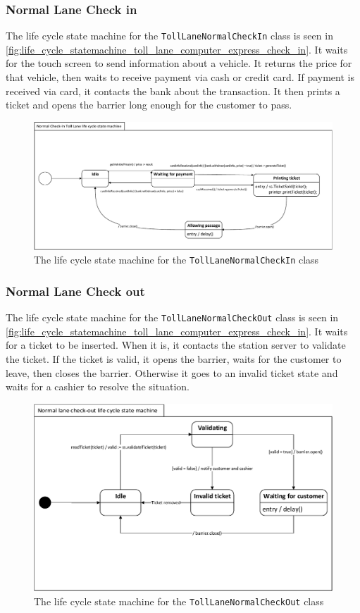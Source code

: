 \subsubsection*{Normal Lane Check in}
The life cycle state machine for the \texttt{TollLaneNormalCheckIn} class is seen in \autoref{fig:life_cycle_statemachine_toll_lane_computer_express_check_in}. It waits for the touch screen to send information about a vehicle. It returns the price for that vehicle, then waits to receive payment via cash or credit card. If payment is received via card, it contacts the bank about the transaction. It then prints a ticket and opens the barrier long enough for the customer to pass.
\begin{figure}[H]
\centering
\includegraphics[width=0.7\linewidth]{img/behaviour_state_machines/life_cycle_state_machines/life_cycle_state_machine_toll_lane_computer}
\caption{The life cycle state machine for the \texttt{TollLaneNormalCheckIn} class}
\label{fig:life_cycle_state_machine_toll_lane_computer}
\end{figure}

\subsubsection*{Normal Lane Check out}
The life cycle state machine for the \texttt{TollLaneNormalCheckOut} class is seen in \autoref{fig:life_cycle_statemachine_toll_lane_computer_express_check_in}. It waits for a ticket to be inserted. When it is, it contacts the station server to validate the ticket. If the ticket is valid, it opens the barrier, waits for the customer to leave, then closes the barrier. Otherwise it goes to an invalid ticket state and waits for a cashier to resolve the situation.
\begin{figure}[H]
\centering
\includegraphics[width=0.7\linewidth]{img/behaviour_state_machines/life_cycle_state_machines/life_cycle_state_machine_toll_computer_normal_lane}
\caption{The life cycle state machine for the \texttt{TollLaneNormalCheckOut} class}
\label{fig:life_cycle_state_machine_toll_computer_normal_lane}
\end{figure}


